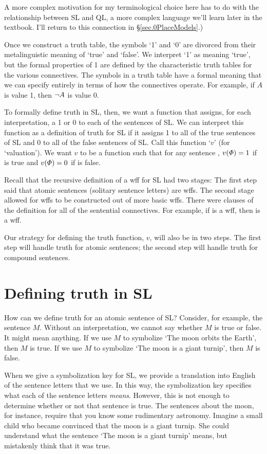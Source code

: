 A more complex motivation for my terminological choice here has to do with the relationship between SL and QL, a more complex language we'll learn later in the textbook. I'll return to this connection in \S\ref{sec.0PlaceModels}.)

Once we construct a truth table, the symbols `1' and `0' are divorced from their metalinguistic meaning of `true' and `false'. We interpret `1' as meaning `true', but the formal properties of 1 are defined by the characteristic truth tables for the various connectives.  The symbols in a truth table have a formal meaning that we can specify entirely in terms of how the connectives operate. For example, if $A$ is value 1, then $\neg A$ is value 0.

To formally define truth in SL, then, we want a function that assigns, for each interpretation, a 1 or 0 to each of the sentences of SL. We can interpret this function as a definition of truth for SL if it assigns 1 to all of the true sentences of SL and 0 to all of the false sentences of SL. Call this function `$v$' (for `valuation'). We want $v$ to be a function such that for any sentence \metaA{}, $v(\varPhi{})=1$ if \metaA{} is true and $v(\varPhi{})=0$ if \metaA{} is false.

Recall that the recursive definition of a wff for SL had two stages: The first step said that atomic sentences (solitary sentence letters) are wffs. The second stage allowed for wffs to be constructed out of more basic wffs. There were clauses of the definition for all of the sentential connectives. For example, if \metaA{} is a wff, then \enot\metaA{} is a wff.

Our strategy for defining the truth function, $v$, will also be in two steps. The first step will handle truth for atomic sentences; the second step will handle truth for compound sentences.


\section{Defining truth in SL}
How can we define truth for an atomic sentence of SL? Consider, for example, the sentence $M$. Without an interpretation, we cannot say whether $M$ is true or false. It might mean anything. If we use $M$ to symbolize `The moon orbits the Earth', then $M$ is true. If we use $M$ to symbolize `The moon is a giant turnip', then $M$ is false.

When we give a symbolization key for SL, we provide a translation into English of the sentence letters that we use. In this way, the symbolization key specifies what each of the sentence letters \emph{means}. However, this is not enough to determine whether or not that sentence is true. The sentences about the moon, for instance, require that you know some rudimentary astronomy. Imagine a small child who became convinced that the moon is a giant turnip. She could understand what the sentence `The moon is a giant turnip' means, but mistakenly think that it was true.

